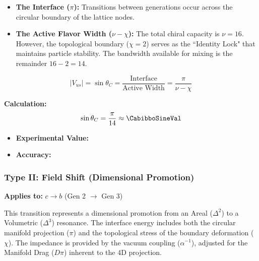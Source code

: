 \begin{itemize}
    \item \textbf{The Interface ($\pi$):} Transitions between generations occur across the circular boundary of the lattice nodes.
    \item \textbf{The Active Flavor Width ($\nu - \chi$):} The total chiral capacity is $\nu = 16$. However, the topological boundary ($\chi = 2$) serves as the ``Identity Lock" that maintains particle stability. The bandwidth available for mixing is the remainder $16 - 2 = 14$.
\end{itemize}

\begin{equation}
|V_{us}| = \sin\theta_C = \frac{\text{Interface}}{\text{Active Width}} = \frac{\pi}{\nu - \chi}
\end{equation}


\textbf{Calculation:}
\begin{equation}
\sin\theta_C = \frac{\pi}{14} \approx \mathbf{\CabibboSineVal}
\end{equation}

\begin{itemize}
    \item \textbf{Experimental Value:} \CabibboSineExperimentalValue
    \item \textbf{Accuracy:} \CabibboSineAccText
\end{itemize}



\subsubsection{Type II: Field Shift (Dimensional Promotion)}
\textbf{Applies to:} $c \to b$ (Gen 2 $\to$ Gen 3)

This transition represents a dimensional promotion from an Areal ($\Delta^2$) to a Volumetric ($\Delta^3$) resonance. The interface energy includes both the circular manifold projection ($\pi$) and the topological stress of the boundary deformation ($\chi$). The impedance is provided by the vacuum coupling ($\alpha^{-1}$), adjusted for the Manifold Drag ($D\pi$) inherent to the 4D projection.

